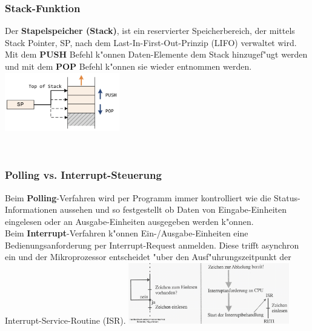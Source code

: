 \begin{minipage}[t]{8cm}
	\subsubsection{Stack-Funktion}
	Der \textbf{Stapelspeicher (Stack)}, ist ein reservierter Speicherbereich, der mittels Stack Pointer, SP, nach dem Last-In-First-Out-Prinzip (LIFO) verwaltet wird. Mit dem \textbf{PUSH} Befehl k"onnen Daten-Elemente dem Stack hinzugef"ugt werden und mit dem \textbf{POP} Befehl k"onnen sie wieder entnommen werden.\\
	\includegraphics[width=5cm]{pics/Stack-Operationen}
\end{minipage}
%
\begin{minipage}{0.5cm}
	\ \
\end{minipage}
%
\begin{minipage}[t]{10cm}
	\subsubsection{Polling vs. Interrupt-Steuerung}
	Beim \textbf{Polling}-Verfahren wird per Programm immer kontrolliert wie die Status-Informationen aussehen und so festgestellt ob Daten von Eingabe-Einheiten eingelesen oder an Ausgabe-Einheiten ausgegeben werden k"onnen.\\
	Beim \textbf{Interrupt}-Verfahren k"onnen Ein-/Ausgabe-Einheiten eine Bedienungsanforderung per Interrupt-Request anmelden. Diese trifft asynchron ein und der Mikroprozessor entscheidet "uber den Ausf"uhrungszeitpunkt der Interrupt-Service-Routine (ISR).
		\includegraphics[width=7cm]{pics/Interrupt-operationen}
\end{minipage}


